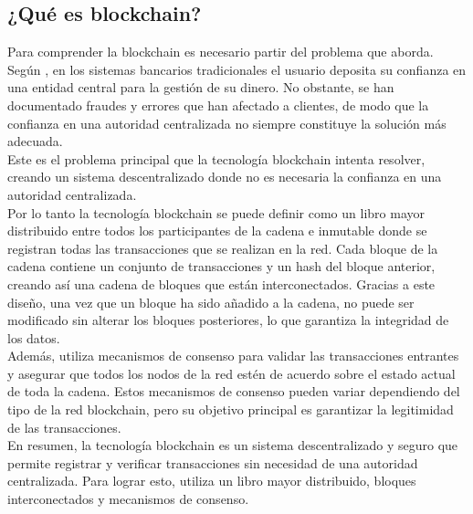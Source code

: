 \subsection{¿Qué es blockchain?}

Para comprender la blockchain es necesario partir del problema que aborda. Según \textcite{whatIsBlockchain}, en los sistemas bancarios tradicionales el usuario deposita su confianza en una entidad central para la gestión de su dinero. No obstante, se han documentado fraudes y errores que han afectado a clientes, de modo que la confianza en una autoridad centralizada no siempre constituye la solución más adecuada.\\

Este es el problema principal que la tecnología blockchain intenta resolver, creando un sistema descentralizado donde no es necesaria la confianza en una autoridad centralizada.\\

Por lo tanto la tecnología blockchain se puede definir como un libro mayor distribuido entre todos los participantes de la cadena e inmutable 
donde se registran todas las transacciones que se realizan en la red. Cada bloque de la cadena contiene un conjunto de transacciones y un hash del bloque anterior, creando así
una cadena de bloques que están interconectados. Gracias a este diseño, una vez que un bloque ha sido añadido a la cadena, no puede ser modificado sin alterar los bloques posteriores,
lo que garantiza la integridad de los datos.\\

Además, utiliza mecanismos de consenso para validar las transacciones entrantes y asegurar que todos los nodos de la red estén de acuerdo sobre el estado actual de toda la cadena.
Estos mecanismos de consenso pueden variar dependiendo del tipo de la red blockchain, pero su objetivo principal es garantizar la legitimidad de las transacciones.\\

En resumen, la tecnología blockchain es un sistema descentralizado y seguro que permite registrar y verificar transacciones sin necesidad de una autoridad centralizada.
Para lograr esto, utiliza un libro mayor distribuido, bloques interconectados y mecanismos de consenso.

